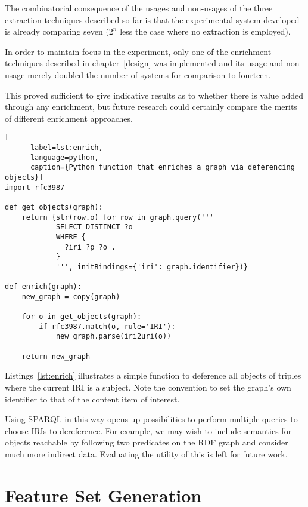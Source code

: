 The combinatorial consequence of the usages and non-usages of the
three extraction techniques described so far is that the
experimental system developed is already comparing seven ($2^n$ less
the case where no extraction is employed).

In order to maintain focus in the experiment, only one of the
enrichment techniques described in chapter~\ref{design} was
implemented and its usage and non-usage merely doubled the
number of systems for comparison to fourteen.

This proved sufficient to give indicative results as to whether there
is value added through any enrichment, but future research could
certainly compare the merits of different enrichment approaches.

\begin{centering}
  \begin{lstlisting}[
      label=lst:enrich,
      language=python,
      caption={Python function that enriches a graph via deferencing objects}]
import rfc3987
    
def get_objects(graph):
    return {str(row.o) for row in graph.query('''
            SELECT DISTINCT ?o
            WHERE {
              ?iri ?p ?o .
            }
            ''', initBindings={'iri': graph.identifier})}

def enrich(graph):
    new_graph = copy(graph)

    for o in get_objects(graph):
        if rfc3987.match(o, rule='IRI'):
            new_graph.parse(iri2uri(o))

    return new_graph
  \end{lstlisting}
\end{centering}

Listings~\ref{lst:enrich} illustrates a simple function to
deference all objects of triples where the current IRI is a subject.
Note the convention to set the graph's own identifier to that of
the content item of interest.

Using SPARQL in this way opens up possibilities to perform multiple
queries to choose IRIs to dereference. For example, we may wish to
include semantics for objects reachable by following two predicates
on the RDF graph and consider much more indirect data. Evaluating
the utility of this is left for future work.

\section{Feature Set Generation}


